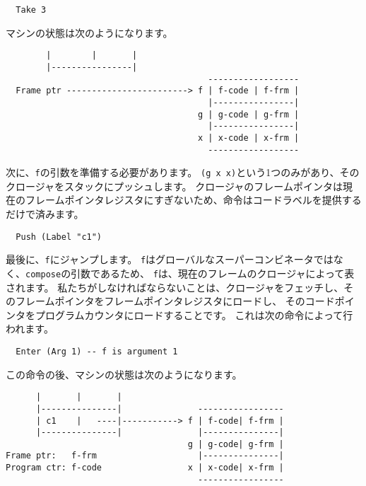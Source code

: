 \documentclass{jarticle}
\begin{document}
\begin{verbatim}
  Take 3
\end{verbatim}

マシンの状態は次のようになります。

\begin{verbatim}
        |        |       |
        |----------------|
                                        ------------------
  Frame ptr ------------------------> f | f-code | f-frm |
                                        |----------------|
                                      g | g-code | g-frm |
                                        |----------------|
                                      x | x-code | x-frm |
                                        ------------------
\end{verbatim}

次に、\texttt{f}の引数を準備する必要があります。
\texttt{(g x x)}という1つのみがあり、そのクロージャをスタックにプッシュします。
クロージャのフレームポインタは現在のフレームポインタレジスタにすぎないため、命令はコードラベルを提供するだけで済みます。

\begin{verbatim}
  Push (Label "c1")
\end{verbatim}

最後に、\texttt{f}にジャンプします。
\texttt{f}はグローバルなスーパーコンビネータではなく、\texttt{compose}の引数であるため、
\texttt{f}は、現在のフレームのクロージャによって表されます。
私たちがしなければならないことは、クロージャをフェッチし、そのフレームポインタをフレームポインタレジスタにロードし、
そのコードポインタをプログラムカウンタにロードすることです。
これは次の命令によって行われます。

\begin{verbatim}
  Enter (Arg 1) -- f is argument 1
\end{verbatim}

この命令の後、マシンの状態は次のようになります。

\begin{verbatim}
      |       |       |
      |---------------|               -----------------
      | c1    |   ----|-----------> f | f-code| f-frm |
      |---------------|               |---------------|
                                    g | g-code| g-frm |
Frame ptr:   f-frm                    |---------------|
Program ctr: f-code                 x | x-code| x-frm |
                                      -----------------
\end{verbatim}
\end{document}

